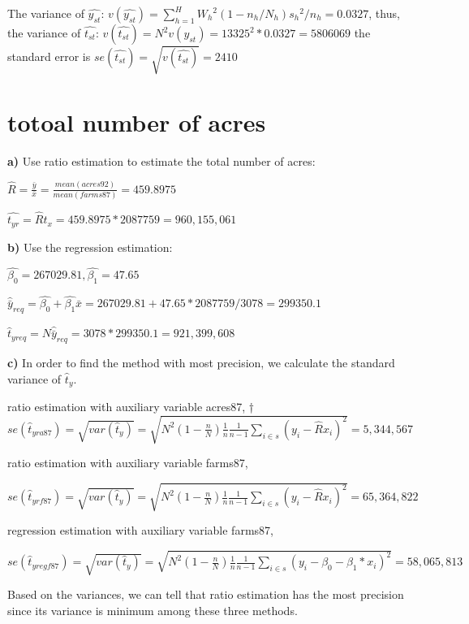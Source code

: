 \documentclass[11pt]{article}
\begin{document}
The variance of $\hat{y_{st}}$: $v(\hat{y_{st}}) = \sum_{h=1}^{H}{W_h}^2(1-n_h/N_h){s_h}^2/n_h = 0.0327$, thus, the variance of $\hat{t_{st}}$: $v(\hat{t_{st}}) = N^2v({y_{st}}) = 13325^2*0.0327 = 5806069$ the standard error is $se(\hat{t_{st}}) = \sqrt{v(\hat{t_{st}})} = 2410$

\section{totoal number of acres}
\textbf{a)}
Use ratio estimation to estimate the total number of acres:

$\hat{R} = \frac{\bar{y}}{\bar{x}} = \frac{mean(acres92)}{mean(farms87)} = 459.8975$

$\hat{t_{yr}} = \hat{R}t_{x} = 459.8975* 2087759 =  960,155,061$

\textbf{b)}
Use the regression estimation:

$\hat{\beta_0} =267029.81, \hat{\beta_1} = 47.65$

$\hat{\bar{y}}_{req} = \hat{\beta_0} + \hat{\beta_1}\bar{x} =267029.81 +  47.65 * 2087759/3078 =   299350.1$

$\hat{t}_{{yreq}} = N\hat{\bar{y}}_{req} =3078 * 299350.1 = 921,399,608$

\textbf{c)}
In order to find the method with most precision, we calculate the standard variance of $ \hat{t}_y$.

ratio estimation with auxiliary variable acres87,
†
$ se(\hat{t}_{yra87}) = \sqrt{var(\hat{t}_y)} = \sqrt{N^2(1-\frac{n}{N})\frac{1}{n}\frac{1}{n-1}\sum_{i\in s}^{}{(y_i - \hat{R}x_i)^2}} = 5,344,567$

ratio estimation with auxiliary variable farms87,

$ se(\hat{t}_{yrf87}) = \sqrt{var(\hat{t}_y)} = \sqrt{N^2(1-\frac{n}{N})\frac{1}{n}\frac{1}{n-1}\sum_{i\in s}^{}{(y_i - \hat{R}x_i)^2}} = 65,364,822$

regression estimation with auxiliary variable farms87,

$ se(\hat{t}_{yregf87}) = \sqrt{var(\hat{t}_y)} = \sqrt{N^2(1-\frac{n}{N})\frac{1}{n}\frac{1}{n-1}\sum_{i\in s}^{}{(y_i - \beta_0 - \beta_1*x_i)^2}} = 58,065,813$

Based on the variances, we can tell that ratio estimation has the most precision since its variance is minimum among these three methods.
\end{document}
